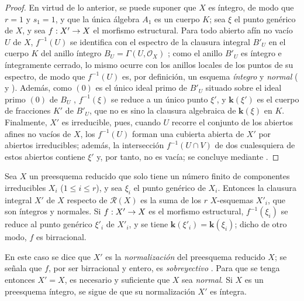 \documentclass[oneside,10pt]{amsart}
\makeatletter
\renewcommand{\leq}{\leqslant}
\newcommand{\ega@arrow}[2]{\mathchoice{#1}{#2}{#2}{#2}}
\renewcommand{\to}{\ega@arrow{\longrightarrow}{\rightarrow}}
\let\EGAOriginalLabel\label
\renewcommand{\label}[1]{\phantomsection\EGAOriginalLabel{#1}}
\makeatother
\begin{document}
\begin{proof}
En virtud de lo anterior, se puede suponer que $X$ es íntegro, de modo que $r=1$ y $s_1=1$, y que la única álgebra $A_1$ es un cuerpo $K$;
sea $\xi$ el punto genérico de $X$, y sea $f:X'\to X$ el morfismo estructural.
Para todo abierto afín no vacío $U$ de $X$, $f^{-1}(U)$ se identifica con el espectro de la clausura integral $B'_U$ en el cuerpo $K$ del anillo íntegro $B_U=\Gamma(U,\mathcal{O}_X)$ ;
como el anillo $B'_U$ es íntegro e íntegramente cerrado, lo mismo ocurre con los anillos locales de los puntos de su espectro, de modo que $f^{-1}(U)$ es, por definición, un esquema \emph{íntegro} y \emph{normal} ( y ).
Además, como $(0)$ es el único ideal primo de $B'_U$ situado sobre el ideal primo $(0)$ de $B_U$ \cite[t.~I, p.~259]{I-13}, $f^{-1}(\xi)$ se reduce a un único punto $\xi'$, y $\boldsymbol{k}(\xi')$ es el cuerpo de fracciones $K'$ de $B'_U$, que no es sino la clausura algebraica de $\boldsymbol{k}(\xi)$ en $K$.
Finalmente, $X'$ es irreducible, pues, cuando $U$ recorre el conjunto de los abiertos afines no vacíos de $X$, los $f^{-1}(U)$ forman una cubierta abierta de $X'$ por abiertos irreducibles;
además, la intersección $f^{-1}(U\cap V)$ de dos cualesquiera de estos abiertos contiene $\xi'$ y, por tanto, no es vacía; se concluye mediante .
\end{proof}

\begin{corollary}[6.3.8]
\label{II.6.3.8-fr}
Sea $X$ un preesquema reducido que solo tiene un número finito de componentes irreducibles $X_i$ ($1\leq i\leq r$), y sea $\xi_i$ el punto genérico de $X_i$.
Entonces la clausura integral $X'$ de $X$ respecto de $\mathcal{R}(X)$ es la suma de los $r$ $X$-esquemas $X'_i$, que son íntegros y normales.
Si $f:X'\to X$ es el morfismo estructural, $f^{-1}(\xi_i)$ se reduce al punto genérico $\xi'_i$ de $X'_i$, y se tiene $\boldsymbol{k}(\xi'_i)=\boldsymbol{k}(\xi_i)$; dicho de otro modo, $f$ es birracional.
\end{corollary}

En este caso se dice que $X'$ es la \emph{normalización} del preesquema reducido $X$;
se señala que $f$, por ser birracional y entero, es \emph{sobreyectivo} .
Para que se tenga entonces $X'=X$, es necesario y suficiente que $X$ sea \emph{normal}.
Si $X$ es un preesquema íntegro, se sigue de  que su normalización $X'$ es íntegra.
\end{document}

